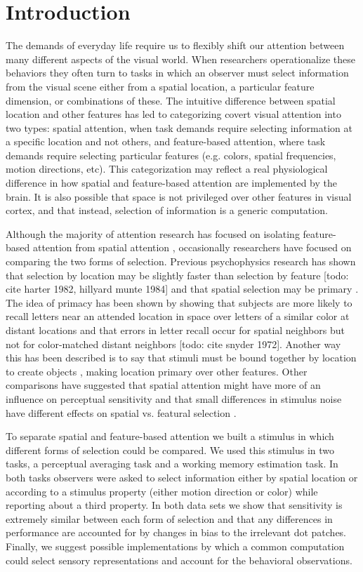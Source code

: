 
\section{Introduction}

The demands of everyday life require us to flexibly shift our attention between many different aspects of the visual world. When researchers operationalize these behaviors they often turn to tasks in which an observer must select information from the visual scene either from a spatial location, a particular feature dimension, or combinations of these. The intuitive difference between spatial location and other features has led to categorizing covert visual attention into two types: spatial attention, when task demands require selecting information at a specific location and not others, and feature-based attention, where task demands require selecting particular features (e.g. colors, spatial frequencies, motion directions, etc). This categorization may reflect a real physiological difference in how spatial and feature-based attention are implemented by the brain. It is also possible that space is not privileged over other features in visual cortex, and that instead, selection of information is a generic computation.

Although the majority of attention research has focused on isolating feature-based attention from spatial attention \citep{Saenz2002-fs}, occasionally researchers have focused on comparing the two forms of selection. Previous psychophysics research has shown that selection by location may be slightly faster than selection by feature \citep{Liu2007-ed} [todo: cite harter 1982, hillyard munte 1984] and that spatial selection may be primary \citep{Soto2004-cs,Tsal1988-qx}. The idea of primacy has been shown by showing that subjects are more likely to recall letters near an attended location in space over letters of a similar color at distant locations \citep{Tsal1988-qx} and that errors in letter recall occur for spatial neighbors but not for color-matched distant neighbors [todo: cite snyder 1972]. Another way this has been described is to say that stimuli must be bound together by location to create objects \citep{Treisman1980-gu}, making location primary over other features. Other comparisons have suggested that spatial attention might have more of an influence on perceptual sensitivity and that small differences in stimulus noise have different effects on spatial vs. featural selection \citep{Ling2009-rq}.

To separate spatial and feature-based attention we built a stimulus in which different forms of selection could be compared. We used this stimulus in two tasks, a perceptual averaging task and a working memory estimation task. In both tasks observers were asked to select information either by spatial location or according to a stimulus property (either motion direction or color) while reporting about a third property. In both data sets we show that sensitivity is extremely similar between each form of selection and that any differences in performance are accounted for by changes in bias to the irrelevant dot patches. Finally, we suggest possible implementations by which a common computation could select sensory representations and account for the behavioral observations. 

